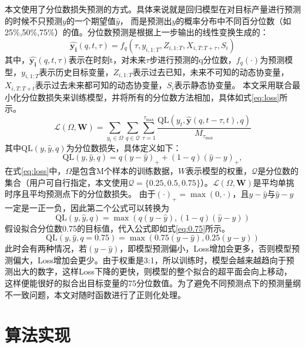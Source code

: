 本文使用了分位数损失预测的方式。具体来说就是回归模型在对目标产量进行预测的时候不只预测$y$的一个期望值$\hat{y}$，
而是预测出$y$的概率分布中不同百分位数（如25\%,50\%,75\%）的值。分位数预测是根据上一步输出的线性变换生成的：
\begin{equation}
    \hat{\boldsymbol{y_i}}(q, t, \tau) = f_q (\tau, y_{i,1:T}, Z_{i,1:T}, X_{i,T:T+\tau}, S_i)
\end{equation}
其中，$\hat{\boldsymbol{y_i}}(q, t, \tau)$表示在时刻t，对未来$\tau$步进行预测的q分位数，$f_q(\cdot)$为预测模型，$ y_{i,1:T}$表示历史目标变量，$Z_{i,1:T}$表示过去已知，未来不可知的动态协变量，$X_{i,T:T+t}$表示过去未来都可知的动态协变量，$S_i$表示静态协变量。
本文采用联合最小化分位数损失来训练模型，并将所有的分位数方法相加，具体如式\eqref{eq:loss}所示。
\begin{equation}
    \mathcal{L}(\Omega, \mathbf{W}) = \sum_{y_t \in \Omega} \sum_{q \in \mathcal{Q} } \sum_{\tau=1}^{\tau_{\max}} \frac{\text{QL}(y_t, \hat{\boldsymbol{y}}(q, t - \tau, t), q)}{M_{\tau_{\max}}}
    \label{eq:loss}
\end{equation}
其中$\text{QL}(y,\hat{y},q)$为分位数损失，具体定义如下：
\begin{equation}
    \text{QL}(y, \hat{y}, q) = q(y - \hat{y})_+ + (1 - q)(\hat{y} - y)_+,
\end{equation}
在式\eqref{eq:loss}中，$\Omega$是包含M个样本的训练数据，$W$表示模型的权重，$\mathcal{Q}$是分位数的集合（用户可自行指定，本文使用$\mathcal{Q} = \{0.25,0.5,0.75\}$）。$\mathcal{L}(\Omega, \mathbf{W})$是平均单挑时序且平均预测点下的分位数损失。
由于$(\cdot)_+ = \max(0, \cdot)$，且$y-\hat{y}$与$\hat{y}-y$一定是一正一负，因此第二个公式可以转换为
\begin{equation}
    \text{QL}(y, \hat{y}, q) =  \max(q(y - \hat{y} ), (1 - q)(\hat{y} - y))
\end{equation}
假设拟合分位数0.75的目标值，代入公式即如式\eqref{eq:0.75}所示。
\begin{equation}
    \text{QL}(y, \hat{y}, q=0.75) =  \max(0.75(y - \hat{y} ), 0.25(\hat{y} - y))
    \label{eq:0.75}
\end{equation}
此时会有两种情况，若$(y - \hat{y} )$，即模型预测偏小，Loss增加会更多，否则模型预测偏大，Loss增加会更少。由于权重是3:1，所以训练时，模型会越来越趋向于预测出大的数字，这样Loss下降的更快，则模型的整个拟合的超平面会向上移动，
这样便能很好的拟合出目标变量的75分位数值。为了避免不同预测点下的预测量纲不一致问题，本文对随时函数进行了正则化处理。
\section{算法实现}
